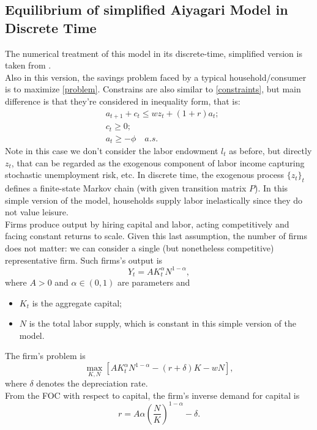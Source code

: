 \documentclass[12pt]{article}
\begin{document}
\subsection{Equilibrium of simplified Aiyagari Model in Discrete Time} 
The numerical treatment of this model in its discrete-time, simplified version is taken from \cite{quantecdisc}. \\
Also in this version, the savings problem faced by a typical household/consumer is to maximize \ref{problem}. Constrains are also similar to \ref{constraints}, but main difference is that they're considered in inequality form, that is:
\begin{align}
&a_{t+1} + c_t \leq wz_t + (1+r)a_t; \nonumber \\
&c_t \geq 0; \nonumber \\
&a_t \geq -\phi \quad a.s .
\end{align}
Note in this case we don't consider the labor endowment $l_t$ as before, but directly $z_t$, that can be regarded as the exogenous component of labor income capturing stochastic unemployment risk, etc. In discrete time, the exogenous process $\{z_t\}_t$ defines a finite-state Markov chain (with given transition matrix $P$). In this simple version of the model, households supply labor inelastically since they do not value leisure. \\
Firms produce output by hiring capital and labor, acting competitively and facing constant returns to scale. Given this last assumption, the number of firms does not matter: we can consider a single (but nonetheless competitive) representative firm. Such firms's output is
\begin{equation}
Y_t = AK_t^\alpha N^{1-\alpha},
\end{equation}
where $A>0$ and $\alpha \in (0,1)$ are parameters and
\begin{itemize}
\item $K_t$ is the aggregate capital;
\item $N$ is the total labor supply, which is constant in this simple version of the model.
\end{itemize}
The firm's problem is 
\begin{equation}
\max_{K,N}\left[AK_t^\alpha N^{1-\alpha} - (r + \delta)K -wN \right], 
\end{equation}
where $\delta$ denotes the depreciation rate. \\
From the FOC with respect to capital, the firm's inverse demand for capital is 
\begin{equation}
\label{invdem}
r = A\alpha\left(\frac{N}{K} \right)^{1 - \alpha} - \delta.
\end{equation}
\end{document}
